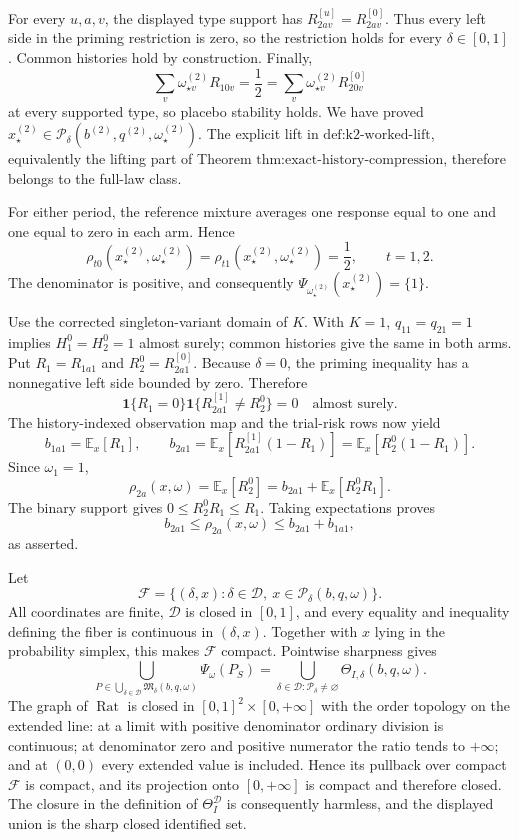 For every \(u,a,v\), the displayed type support has \(R^{[u]}_{2av}=R^{[0]}_{2av}\).  Thus every left side in the priming restriction is zero, so the restriction holds for every \(\delta\in[0,1]\).  Common histories hold by construction.  Finally,
\[
\sum_v\omega_{\star v}^{(2)}R_{10v}=\frac12
=\sum_v\omega_{\star v}^{(2)}R^{[0]}_{20v}
\]
at every supported type, so placebo stability holds.  We have proved \(x_\star^{(2)}\in\mathcal P_\delta(b^{(2)},q^{(2)},\omega_\star^{(2)})\).  The explicit lift in \(\text{def:k2-worked-lift}\), equivalently the lifting part of Theorem \(\text{thm:exact-history-compression}\), therefore belongs to the full-law class.

For either period, the reference mixture averages one response equal to one and one equal to zero in each arm.  Hence
\[
\rho_{t0}(x_\star^{(2)},\omega_\star^{(2)})
=\rho_{t1}(x_\star^{(2)},\omega_\star^{(2)})=\frac12,
\qquad t=1,2.
\]
The denominator is positive, and consequently \(\Psi_{\omega_\star^{(2)}}(x_\star^{(2)})=\{1\}\).

Use the corrected singleton-variant domain of \(K\).  With \(K=1\), \(q_{11}=q_{21}=1\) implies \(H_1^0=H_2^0=1\) almost surely; common histories give the same in both arms.  Put \(R_1=R_{1a1}\) and \(R_2^0=R^{[0]}_{2a1}\).  Because \(\delta=0\), the priming inequality has a nonnegative left side bounded by zero.  Therefore
\[
\mathbf 1\{R_1=0\}\mathbf 1\{R^{[1]}_{2a1}\ne R_2^0\}=0
\quad\text{almost surely}.
\]
The history-indexed observation map and the trial-risk rows now yield
\[
b_{1a1}=\mathbb E_x[R_1],
\qquad
b_{2a1}=\mathbb E_x[R^{[1]}_{2a1}(1-R_1)]
=\mathbb E_x[R_2^0(1-R_1)].
\]
Since \(\omega_1=1\),
\[
\rho_{2a}(x,\omega)=\mathbb E_x[R_2^0]
=b_{2a1}+\mathbb E_x[R_2^0R_1].
\]
The binary support gives \(0\leq R_2^0R_1\leq R_1\).  Taking expectations proves
\[
b_{2a1}\leq\rho_{2a}(x,\omega)\leq b_{2a1}+b_{1a1},
\]
as asserted.

Let
\[
\mathcal F=\{(\delta,x):\delta\in\mathcal D,\ x\in\mathcal P_\delta(b,q,\omega)\}.
\]
All coordinates are finite, \(\mathcal D\) is closed in \([0,1]\), and every equality and inequality defining the fiber is continuous in \((\delta,x)\).  Together with \(x\) lying in the probability simplex, this makes \(\mathcal F\) compact.  Pointwise sharpness gives
\[
\bigcup_{P\in\bigcup_{\delta\in\mathcal D}\mathfrak M_\delta(b,q,\omega)}
\Psi_\omega(P_S)
=\bigcup_{\delta\in\mathcal D:\mathcal P_\delta\ne\varnothing}
\Theta_{I,\delta}(b,q,\omega).
\]
The graph of \(\operatorname{Rat}\) is closed in \([0,1]^2\times[0,+\infty]\) with the order topology on the extended line: at a limit with positive denominator ordinary division is continuous; at denominator zero and positive numerator the ratio tends to \(+\infty\); and at \((0,0)\) every extended value is included.  Hence its pullback over compact \(\mathcal F\) is compact, and its projection onto \([0,+\infty]\) is compact and therefore closed.  The closure in the definition of \(\Theta_I^{\mathcal D}\) is consequently harmless, and the displayed union is the sharp closed identified set.

